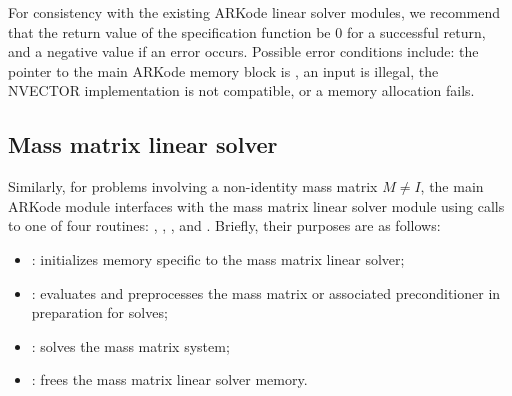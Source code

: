 \documentclass[letterpaper,10pt,english]{sphinxmanual}
\begin{document}
For consistency with the existing ARKode linear solver modules, we
recommend that the return value of the specification function be 0 for
a successful return, and a negative value if an error occurs.
Possible error conditions include: the pointer to the main ARKode
memory block is , an input is illegal, the NVECTOR
implementation is not compatible, or a memory allocation fails.


\subsection{Mass matrix linear solver}
\label{linear_solvers/custom:mass-matrix-linear-solver}
Similarly, for problems involving a non-identity mass matrix
\(M\ne I\), the main ARKode module interfaces with the mass matrix
linear solver module using calls to one of four routines:
{\hyperref[linear_solvers/custom:c.minit]{\emph{}}}, {\hyperref[linear_solvers/custom:c.msetup]{\emph{}}}, {\hyperref[linear_solvers/custom:c.msolve]{\emph{}}}, and
{\hyperref[linear_solvers/custom:c.mfree]{\emph{}}}. Briefly, their purposes are as follows:
\begin{itemize}
\item {} 
{\hyperref[linear_solvers/custom:c.minit]{\emph{}}}: initializes memory specific to the mass matrix
linear solver;

\item {} 
{\hyperref[linear_solvers/custom:c.msetup]{\emph{}}}: evaluates and preprocesses the mass matrix or
associated preconditioner in preparation for solves;

\item {} 
{\hyperref[linear_solvers/custom:c.msolve]{\emph{}}}: solves the mass matrix system;

\item {} 
{\hyperref[linear_solvers/custom:c.mfree]{\emph{}}}: frees the mass matrix linear solver memory.

\end{itemize}
\end{document}
